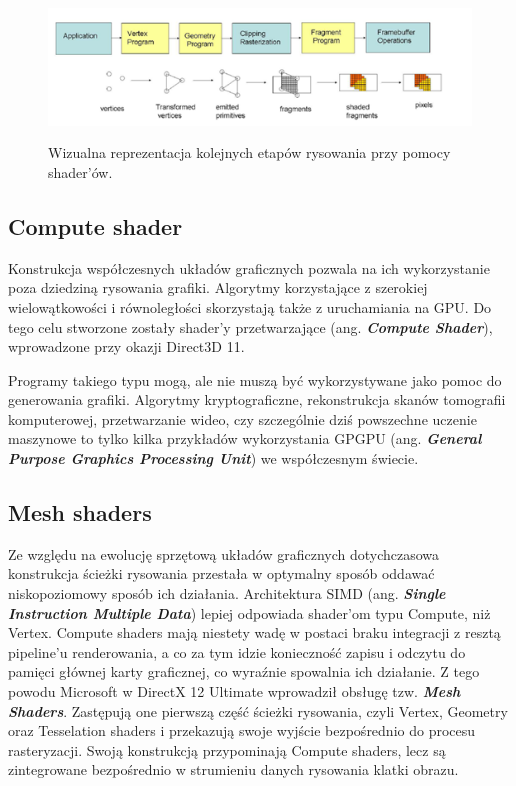 \begin{figure}[htbp] %
	\centering
	\includegraphics[width=5.34091in,height=1.48711in]{images/19_shader_pipeline.png}
	\caption{Wizualna reprezentacja kolejnych etapów rysowania przy pomocy shader'ów. \cite{researchgate:openglpipeline:2024}}
	\label{fig:shader_pipeline} %
\end{figure}

\subsection{Compute shader}
Konstrukcja współczesnych układów graficznych pozwala na ich
wykorzystanie poza dziedziną rysowania grafiki. Algorytmy korzystające z
szerokiej wielowątkowości i równoległości skorzystają także z
uruchamiania na GPU. Do tego celu stworzone zostały shader'y
przetwarzające (ang. \emph{\textbf{Compute Shader}}), wprowadzone przy
okazji Direct3D 11.

Programy takiego typu mogą, ale nie muszą być wykorzystywane jako pomoc
do generowania grafiki. Algorytmy kryptograficzne, rekonstrukcja skanów
tomografii komputerowej, przetwarzanie wideo, czy szczególnie dziś
powszechne uczenie maszynowe to tylko kilka przykładów wykorzystania
GPGPU (ang. \emph{\textbf{General Purpose Graphics Processing Unit}}) we
współczesnym świecie.

\subsection{Mesh shaders}
Ze względu na ewolucję sprzętową układów graficznych dotychczasowa
konstrukcja ścieżki rysowania przestała w optymalny sposób oddawać
niskopoziomowy sposób ich działania. Architektura SIMD (ang.
\emph{\textbf{Single Instruction Multiple Data}}) lepiej odpowiada
shader'om typu Compute, niż Vertex. Compute shaders mają niestety wadę w
postaci braku integracji z resztą pipeline'u renderowania, a co za tym
idzie konieczność zapisu i odczytu do pamięci głównej karty graficznej,
co wyraźnie spowalnia ich działanie. Z tego powodu Microsoft w DirectX 12 Ultimate wprowadził obsługę tzw.
\emph{\textbf{Mesh Shaders}}. Zastępują one pierwszą część ścieżki
rysowania, czyli Vertex, Geometry oraz Tesselation shaders i przekazują
swoje wyjście bezpośrednio do procesu rasteryzacji. Swoją konstrukcją
przypominają Compute shaders, lecz są zintegrowane bezpośrednio w
strumieniu danych rysowania klatki obrazu.

